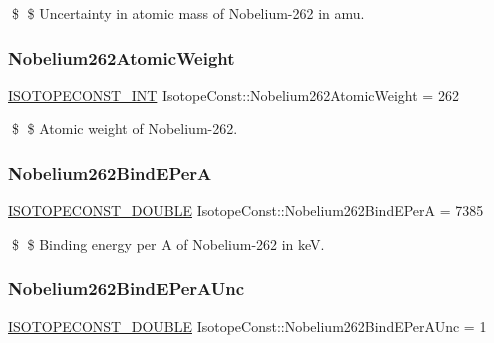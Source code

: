 \$ \$ Uncertainty in atomic mass of Nobelium-\/262 in amu. \mbox{\label{group___isotope_const-_nobelium-_no262_ga644de0d49b7499df7bc433c477e89ed9}} 
\subsubsection{\texorpdfstring{Nobelium262\+Atomic\+Weight}{Nobelium262AtomicWeight}}
{\footnotesize\ttfamily \mbox{\hyperlink{group___isotope_const-_macros_ga5f18360b3e99483a35c32d789e62621c}{I\+S\+O\+T\+O\+P\+E\+C\+O\+N\+S\+T\+\_\+\+I\+NT}} Isotope\+Const\+::\+Nobelium262\+Atomic\+Weight = 262}

\$ \$ Atomic weight of Nobelium-\/262. \mbox{\label{group___isotope_const-_nobelium-_no262_gaed9fc74e3b83ee3f3cfb6de76081f53d}} 
\subsubsection{\texorpdfstring{Nobelium262\+Bind\+E\+PerA}{Nobelium262BindEPerA}}
{\footnotesize\ttfamily \mbox{\hyperlink{group___isotope_const-_macros_ga8f45a7272ce02c0b4c65c44636ed719a}{I\+S\+O\+T\+O\+P\+E\+C\+O\+N\+S\+T\+\_\+\+D\+O\+U\+B\+LE}} Isotope\+Const\+::\+Nobelium262\+Bind\+E\+PerA = 7385}

\$ \$ Binding energy per A of Nobelium-\/262 in keV. \mbox{\label{group___isotope_const-_nobelium-_no262_ga9c4dde931456f0653ecd7a01da6a2030}} 
\subsubsection{\texorpdfstring{Nobelium262\+Bind\+E\+Per\+A\+Unc}{Nobelium262BindEPerAUnc}}
{\footnotesize\ttfamily \mbox{\hyperlink{group___isotope_const-_macros_ga8f45a7272ce02c0b4c65c44636ed719a}{I\+S\+O\+T\+O\+P\+E\+C\+O\+N\+S\+T\+\_\+\+D\+O\+U\+B\+LE}} Isotope\+Const\+::\+Nobelium262\+Bind\+E\+Per\+A\+Unc = 1}

